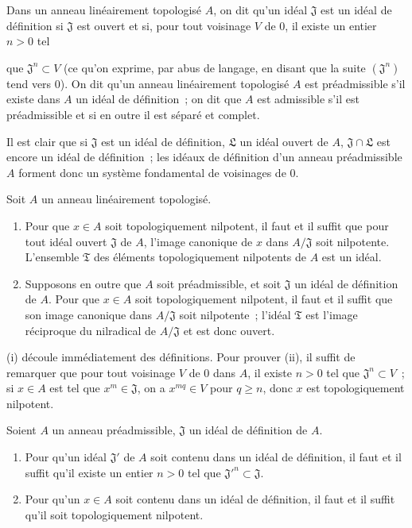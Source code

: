 \begin{definition}[7.1.2]
\label{0.7.1.2-fr}
Dans un anneau linéairement topologisé $A$, on dit qu'un idéal $\mathfrak J$
est un idéal de définition si $\mathfrak J$ est ouvert et si, pour tout
voisinage $V$ de $0$, il existe un entier $n>0$ tel


que $\mathfrak J^n\subset V$ (ce qu'on exprime, par abus de langage, en disant
que la suite $(\mathfrak J^n)$ tend vers $0$). On dit qu'un anneau linéairement
topologisé $A$ est préadmissible s'il existe dans $A$ un idéal de définition~;
on dit que $A$ est admissible s'il est préadmissible et si en outre il est
séparé et complet.
\end{definition}

Il est clair que si $\mathfrak J$ est un idéal de définition, $\mathfrak L$ un
idéal ouvert de $A$, $\mathfrak J\cap\mathfrak L$ est encore un idéal de
définition~; les idéaux de définition d'un anneau préadmissible $A$ forment
donc un système fondamental de voisinages de $0$.

\begin{lemma}[7.1.3]
\label{0.7.1.3-fr}
Soit $A$ un anneau linéairement topologisé.
\begin{enumerate}
  \item[{\upshape(i)}] Pour que $x\in A$ soit topologiquement nilpotent, il
    faut et il suffit que pour tout idéal ouvert $\mathfrak J$ de $A$, l'image
    canonique de $x$ dans $A/\mathfrak J$ soit nilpotente. L'ensemble
    $\mathfrak T$ des éléments topologiquement nilpotents de $A$ est un idéal.
  \item[{\upshape(ii)}] Supposons en outre que $A$ soit préadmissible, et soit
    $\mathfrak J$ un idéal de définition de $A$. Pour que $x\in A$ soit
    topologiquement nilpotent, il faut et il suffit que son image canonique dans
    $A/\mathfrak J$ soit nilpotente~; l'idéal $\mathfrak T$ est l'image
    réciproque du nilradical de $A/\mathfrak J$ et est donc ouvert.
\end{enumerate}
\end{lemma}

(i) découle immédiatement des définitions. Pour prouver (ii), il suffit de
remarquer que pour tout voisinage $V$ de $0$ dans $A$, il existe $n>0$ tel que
$\mathfrak J^n\subset V$~; si $x\in A$ est tel que $x^m\in\mathfrak J$, on a
$x^{mq}\in V$ pour $q\geq n$, donc $x$ est topologiquement nilpotent.

\begin{proposition}[7.1.4]
\label{0.7.1.4-fr}
Soient $A$ un anneau préadmissible, $\mathfrak J$ un idéal de définition de
$A$.
\begin{enumerate}
  \item[{\upshape(i)}] Pour qu'un idéal $\mathfrak J'$ de $A$ soit contenu
    dans un idéal de définition, il faut et il suffit qu'il existe un entier
    $n>0$ tel que ${\mathfrak J'}^n\subset\mathfrak J$.
  \item[{\upshape(ii)}] Pour qu'un $x\in A$ soit contenu dans un idéal de
    définition, il faut et il suffit qu'il soit topologiquement nilpotent.
\end{enumerate}
\end{proposition}

